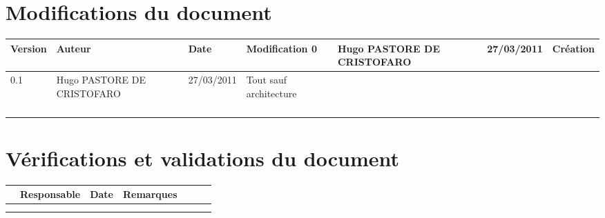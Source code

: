
\section*{Modifications du document}

\begin{center}
\begin{longtable}{|m{14mm}|m{36mm}|m{36mm}|m{60mm}|}
\hline
Version & Auteur & Date & Modification\endhead \hline
0
& %
Hugo PASTORE DE CRISTOFARO
& %
27/03/2011
& %
Création
\\\hline
0.1
& %
Hugo PASTORE DE CRISTOFARO
& %
27/03/2011
& %
Tout sauf architecture
\\\hline
& %
& %
& %
\\\hline
& %
& %
& %
\\\hline

& %

& %

& %

\\\hline

& %

& %

& %

\\\hline
\end{longtable}
\end{center}


\section*{Vérifications et validations du document}

\begin{center}
\begin{longtable}{|m{15mm}|m{36mm}|m{36mm}|m{60mm}|}
\hline
 & Responsable & Date & Remarques\endhead \hline
& %
& %
& %
\\\hline
& %
& %
& %
\\\hline
& %
& %
& %
\\\hline
\end{longtable}
\end{center}

\pagebreak

